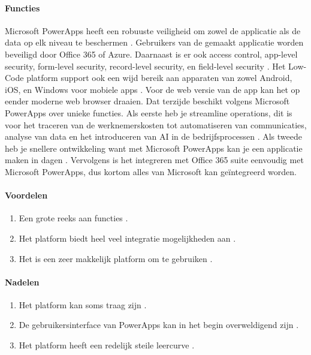 \paragraph{Functies}
Microsoft PowerApps heeft een robuuste veiligheid om zowel de applicatie als de data op elk niveau te beschermen \autocite{Nguyen}.
Gebruikers van de gemaakt applicatie worden beveiligd door Office 365 of Azure. Daarnaast is er ook access control, app-level security, form-level security, record-level security, en field-level security  \autocite{Nguyen}.
Het Low-Code platform support ook een wijd bereik aan apparaten van zowel Android, iOS, en Windows voor mobiele apps \autocite{Nguyen}.
Voor de web versie van de app kan het op eender moderne web browser draaien. Dat terzijde beschikt volgens \textcite{Gupta2023} Microsoft PowerApps over unieke functies. Als eerste heb je 
streamline operations, dit is voor het traceren van de werknemerskosten tot automatiseren van communicaties, analyse van data en het introduceren van AI in de bedrijfsprocessen \autocite{Gupta2023}.
Als tweede heb je snellere ontwikkeling want met Microsoft PowerApps kan je een applicatie maken in dagen \autocite{Gupta2023}. Vervolgens is het integreren met Office 365 suite eenvoudig met Microsoft PowerApps,
 dus kortom alles van Microsoft kan geïntegreerd worden.

 \paragraph*{Voordelen}
\begin{enumerate}
    \item Een grote reeks aan functies \autocite{Marvin2018}.
    \item Het platform biedt heel veel integratie mogelijkheden aan \autocite{Marvin2018}.
    \item Het is een zeer makkelijk platform om te gebruiken \autocite{Marvin2018}.
\end{enumerate}


\paragraph*{Nadelen}
\begin{enumerate}
    \item Het platform kan soms traag zijn \autocite{Marvin2018}.
    \item De gebruikersinterface van PowerApps kan in het begin overweldigend zijn \autocite{Marvin2018}.
    \item Het platform heeft een redelijk steile leercurve \autocite{Marvin2018}.
\end{enumerate}

